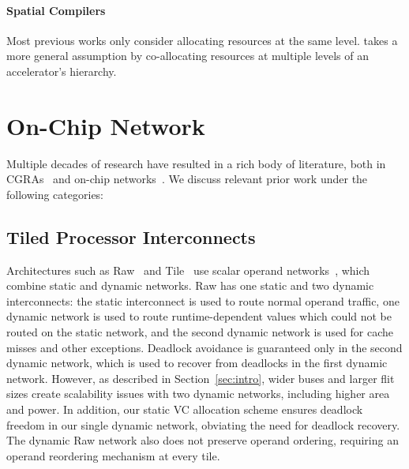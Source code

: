 \paragraph{Spatial Compilers}
Most previous works \cite{nowatzki, spatial-computation} only consider allocating resources at the same level. 
\name{} takes a more general assumption by co-allocating resources at multiple levels of an accelerator's hierarchy.


\section{On-Chip Network}

Multiple decades of research have resulted in a rich body of literature, both in CGRAs~\cite{cgraSurvey1, cgraSurvey2} and on-chip networks~\cite{ocn-synthesis}. We discuss relevant prior work under the following categories:
\subsection{Tiled Processor Interconnects} Architectures such as Raw~\cite{raw} and Tile~\cite{tile} use scalar operand networks~\cite{son}, which combine static and dynamic networks. Raw has one static and two dynamic interconnects: the static interconnect is used to route normal operand traffic, one dynamic network is used to route runtime-dependent values which could not be routed on the static network, and the second dynamic network is used for cache misses and other exceptions. Deadlock avoidance is guaranteed only in the second dynamic network, which is used to recover from deadlocks in the first dynamic network. However, as described in Section~\ref{sec:intro}, wider buses and larger flit sizes create scalability issues with two dynamic networks, including higher area and power. In addition, our static VC allocation scheme ensures deadlock freedom in our single dynamic network, obviating the need for deadlock recovery.
The dynamic Raw network also does not preserve operand ordering, requiring an operand reordering mechanism at every tile.

